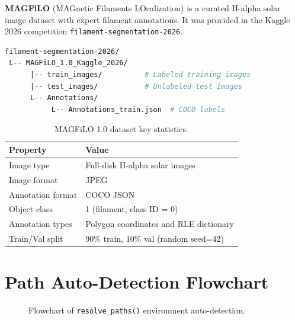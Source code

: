 \documentclass[12pt,a4paper,openany]{report}
\begin{document}
\textbf{MAGFiLO} (MAGnetic Filaments LOcalization) is a curated H-alpha solar image
dataset with expert filament annotations. It was provided in the Kaggle 2026 competition
\texttt{filament-segmentation-2026}.

\begin{lstlisting}[language=bash,style=pystyle,
  caption={MAGFiLO dataset directory structure.}]
filament-segmentation-2026/
 L-- MAGFiLO_1.0_Kaggle_2026/
      |-- train_images/          # Labeled training images
      |-- test_images/           # Unlabeled test images
      L-- Annotations/
           L-- Annotations_train.json  # COCO labels
\end{lstlisting}

\begin{table}[H]
\centering
\caption{MAGFiLO 1.0 dataset key statistics.}
\renewcommand{\arraystretch}{1.3}
\begin{tabular}{l l}
\toprule
\textbf{Property}   & \textbf{Value} \\
\midrule
Image type          & Full-disk H-alpha solar images \\
Image format        & JPEG \\
Annotation format   & COCO JSON \\
Object class        & 1 (filament, class ID = 0) \\
Annotation types    & Polygon coordinates and RLE dictionary \\
Train/Val split     & 90\% train, 10\% val (random seed=42) \\
\bottomrule
\end{tabular}
\label{tab:dataset}
\end{table}

\section{Path Auto-Detection Flowchart}

\begin{figure}[H]
\centering
{}
\caption{Flowchart of \texttt{resolve\_paths()} environment auto-detection.}
\label{fig:resolve}
\end{figure}
\end{document}
